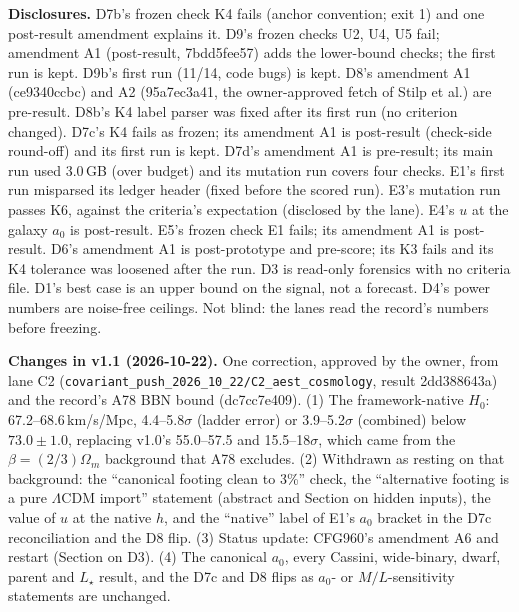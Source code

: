 \documentclass[10pt]{article}
\begin{document}
\textbf{Disclosures.} D7b's frozen check K4 fails (anchor convention; exit 1) and one post-result amendment explains it. D9's frozen checks U2, U4, U5 fail; amendment A1 (post-result, 7bdd5fee57) adds the lower-bound checks; the first run is kept. D9b's first run (11/14, code bugs) is kept. D8's amendment A1 (ce9340ccbc) and A2 (95a7ec3a41, the owner-approved fetch of Stilp et al.) are pre-result. D8b's K4 label parser was fixed after its first run (no criterion changed). D7c's K4 fails as frozen; its amendment A1 is post-result (check-side round-off) and its first run is kept. D7d's amendment A1 is pre-result; its main run used 3.0\,GB (over budget) and its mutation run covers four checks. E1's first run misparsed its ledger header (fixed before the scored run). E3's mutation run passes K6, against the criteria's expectation (disclosed by the lane). E4's $u$ at the galaxy $a_0$ is post-result. E5's frozen check E1 fails; its amendment A1 is post-result. D6's amendment A1 is post-prototype and pre-score; its K3 fails and its K4 tolerance was loosened after the run. D3 is read-only forensics with no criteria file. D1's best case is an upper bound on the signal, not a forecast. D4's power numbers are noise-free ceilings. Not blind: the lanes read the record's numbers before freezing.

\textbf{Changes in v1.1 (2026-10-22).} One correction, approved by the owner, from lane C2 (\texttt{covariant\_push\_2026\_10\_22/C2\_aest\_cosmology}, result 2dd388643a) and the record's A78 BBN bound (dc7cc7e409). (1) The framework-native $H_0$: 67.2--68.6\,km/s/Mpc, 4.4--5.8$\sigma$ (ladder error) or 3.9--5.2$\sigma$ (combined) below $73.0\pm1.0$, replacing v1.0's 55.0--57.5 and 15.5--18$\sigma$, which came from the $\beta=(2/3)\Omega_m$ background that A78 excludes. (2) Withdrawn as resting on that background: the ``canonical footing clean to 3\%'' check, the ``alternative footing is a pure $\Lambda$CDM import'' statement (abstract and Section on hidden inputs), the value of $u$ at the native $h$, and the ``native'' label of E1's $a_0$ bracket in the D7c reconciliation and the D8 flip. (3) Status update: CFG960's amendment A6 and restart (Section on D3). (4) The canonical $a_0$, every Cassini, wide-binary, dwarf, parent and $L_\star$ result, and the D7c and D8 flips as $a_0$- or $M/L$-sensitivity statements are unchanged.
\end{document}
